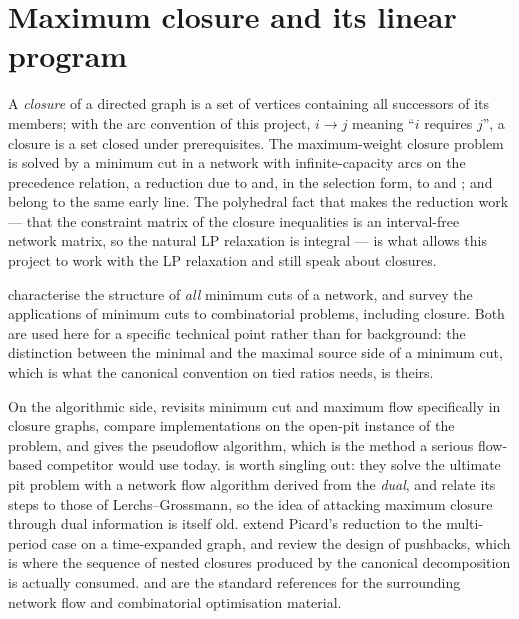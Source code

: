 \section{Maximum closure and its linear program}\label{sec:closure}

A \emph{closure} of a directed graph is a set of vertices containing all successors
of its members; with the arc convention of this project, \(i \to j\) meaning
``\(i\) requires \(j\)'', a closure is a set closed under prerequisites. The
maximum-weight closure problem is solved by a minimum cut in a network with
infinite-capacity arcs on the precedence relation, a reduction due to
\citet{Picard1976} and, in the selection form, to \citet{Rhys1970} and
\citet{Balinski1970}; \citet{JohnsonNiemi1983} and \citet{Gale1957} belong to
the same early line. The polyhedral fact that makes the reduction work --- that
the constraint matrix of the closure inequalities is an interval-free network
matrix, so the natural LP relaxation is integral --- is what allows this project
to work with the LP relaxation and still speak about closures.

\citet{PicardQueyranne1980} characterise the structure of \emph{all} minimum
cuts of a network, and \citet{PicardQueyranne1982} survey the applications of
minimum cuts to combinatorial problems, including closure. Both are used here
for a specific technical point rather than for background: the distinction
between the minimal and the maximal source side of a minimum cut, which is what
the canonical convention on tied ratios needs, is theirs.

On the algorithmic side, \citet{Hochbaum2001} revisits minimum cut and maximum
flow specifically in closure graphs, \citet{HochbaumChen2000} compare
implementations on the open-pit instance of the problem, and
\citet{Hochbaum2008} gives the pseudoflow algorithm, which is the method a
serious flow-based competitor would use today. \citet{UnderwoodTolwinski1998}
is worth singling out: they solve the ultimate pit problem with a network flow
algorithm derived from the \emph{dual}, and relate its steps to those of
Lerchs--Grossmann, so the idea of attacking maximum closure through dual
information is itself old. \citet{AmankwahEtAl2014} extend Picard's reduction
to the multi-period case on a time-expanded graph, and \citet{MeagherEtAl2014}
review the design of pushbacks, which is where the sequence of nested closures
produced by the canonical decomposition is actually consumed. \citet{AhujaEtAl1993} and
\citet{Schrijver2003} are the standard references for the surrounding network
flow and combinatorial optimisation material.

